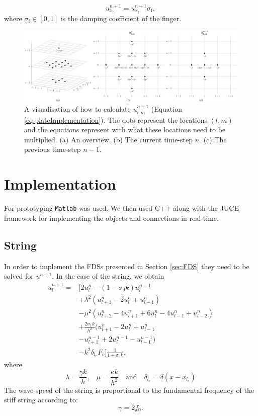 \documentclass{article}
\begin{document}
\begin{equation}
    u_{x_\text{f}}^{n+1} = u_{x_\text{f}}^{n+1}  \sigma_\text{f},
\end{equation}
where $\sigma_\text{f} \in [0,1]$ is the damping coefficient of the finger. 
\begin{figure}[t]
    \centering
    \includegraphics[width=2.1\columnwidth]{FDSPlateUTot}
    \caption{A visualisation of how to calculate $u_{l,m}^{n+1}$ (Equation \eqref{eq:plateImplementation}). The dots represent the locations $(l,m)$ and the equations represent with what these locations need to be multiplied. (a) An overview. (b) The current time-step $n$. (c) The previous time-step $n-1$.  \label{fig:example}}
 \end{figure}
\section{Implementation}
For prototyping \texttt{Matlab} was used. We then used C++ along with the JUCE framework for implementing the objects and connections in real-time.
\subsection{String}
In order to implement the FDSs presented in Section \ref{sec:FDS} they need to be solved for $u^{n+1}$. In the case of the string, we obtain
\begin{equation}
    \begin{aligned}\label{eq:stringImplementatino}
        u_l^{n+1} = &\Big[2u_l^n - (1 - \sigma_0k) u_l^{n-1} \\
        & +\lambda^2(u_{l+1}^n - 2u_l^n + u_{l-1}^n)\\
        &- \mu^2(u_{l+2}^n - 4u_{l+1}^n + 6u_l^n - 4u_{l-1}^n + u_{l-2}^n) \\
        &+ \frac{2\sigma_1k}{h^2}(u_{l+1}^n - 2u_l^n + u_{l-1}^n\\
        &- u_{l+1}^{n-1} + 2u_l^{n-1} - u_{l-1}^{n-1})\\
        &-k^2\delta_{l_e}F_\text{e}\Big] \frac{1}{1 + \sigma_0k},
    \end{aligned}
\end{equation}
where
\begin{equation}\nonumber
\lambda = \frac{\gamma k}{h}\text{,} \quad \mu =  \frac{\kappa k}{h^2} \quad \text{and} \quad \delta_{l_\text{e}} = \delta(x-x_{l_\text{e}}) 
\end{equation}
The wave-speed of the string is proportional to the fundamental frequency of the stiff string according to: 
\begin{equation}
    \gamma = 2 f_0.
\end{equation}
\end{document}
